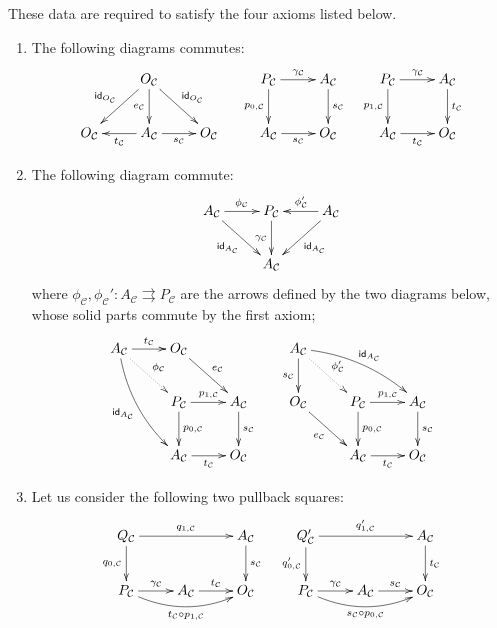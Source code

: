 \documentclass[a4paper,UKenglish,cleveref,pdftex,thm-restate,numberwithinsect]{lipics-v2021}
\newcommand{\id}[1]{\mathsf{id}_{#1}}
\begin{document}
\begin{definition}
These data are required to satisfy the four axioms listed below.
\begin{enumerate}
	\item The following diagrams commutes:
	\[\xymatrix{& O_{\mathcal{C}} \ar[d]_{e_{\mathcal{C}}}\ar[dr]^{\id{O_{\mathcal{C}}}} \ar[dl]_{\id{O_{\mathcal{C}}}} &  &P_{\mathcal{C}} \ar[r]^{\gamma_{\mathcal{C}}} \ar[d]_{p_{0, \mathcal{C}}}& A_{\mathcal{C}} \ar[d]^{s_{\mathcal{C}}} &P_{\mathcal{C}} \ar[r]^{\gamma_{\mathcal{C}}} \ar[d]_{p_{1, \mathcal{C}}}& A_{\mathcal{C}} \ar[d]^{t_{\mathcal{C}}}\\ O_{\mathcal{C}} & A_{\mathcal{C}}  \ar[l]^{t_{\mathcal{C}}}\ar[r]_{s_{\mathcal{C}}}& O_{\mathcal{C}} &  A_{\mathcal{C}} \ar[r]_{s_{\mathcal{C}}}& O_{\mathcal{C}} & A_{\mathcal{C}} \ar[r]_{t_{\mathcal{C}}}& O_{\mathcal{C}} }\]
		\item The following diagram commute:
	\[\xymatrix{A_{\mathcal{C}} \ar[dr]_{\id{A_{\mathcal{C}}}}\ar[r]^{\phi_{\mathcal{C}}}& P_{\mathcal{C}} \ar[d]_{\gamma_{\mathcal{C}}}&A_{\mathcal{C}} \ar[l]_{\phi_{\mathcal{C}}'} \ar[dl]^{\id{A_{\mathcal{C}}}} \\ & A_{\mathcal{C}}}\]
	where $\phi_{\mathcal{C}}, \phi_{\mathcal{C}}'\colon A_{\mathcal{C}}\rightrightarrows P_{\mathcal{C}}$ are the arrows defined by the two diagrams below, whose solid parts commute by the first axiom;
	\[\xymatrix{A_{\mathcal{C}} \ar@/_.3cm/[ddr]_{\id{A_{\mathcal{C}}}} \ar[r]^{t_{\mathcal{C}}}\ar@{.>}[dr]^{\phi_{\mathcal{C}}} & O_{\mathcal{C}} \ar[dr]^{e_{\mathcal{C}}}  &&A_{\mathcal{C}} \ar@/^.3cm/[drr]^{\id{A_{\mathcal{C}}}} \ar[d]_{s_{\mathcal{C}}}\ar@{.>}[dr]^{\phi_{\mathcal{C}}'} \\ & P_{\mathcal{C}} \ar[r]^{p_{1, \mathcal{C}}} \ar[d]^{p_{0, \mathcal{C}}}& A_{\mathcal{C}} \ar[d]^{s_{\mathcal{C}}} &  O_{\mathcal{C}} \ar[dr]_{e_{\mathcal{C}}} & P_{\mathcal{C}} \ar[r]^{p_{1, \mathcal{C}}} \ar[d]^{p_{0, \mathcal{C}}}& A_{\mathcal{C}} \ar[d]^{s_{\mathcal{C}}} \\ & A_{\mathcal{C}} \ar[r]_{t_{\mathcal{C}}}& O_{\mathcal{C}} & &A_{\mathcal{C}} \ar[r]_{t_{\mathcal{C}}}& O_{\mathcal{C}} }\]

\item Let us consider the following two pullback squares:
	\[\xymatrix{Q_{\mathcal{C}} \ar[rr]^{q_{1, \mathcal{C}}} \ar[d]_{q_{0, \mathcal{C}}} & & A_{\mathcal{C}} \ar[d]^{s_{\mathcal{C}}}& Q_{\mathcal{C}}' \ar[rr]^{q'_{1, \mathcal{C}}} \ar[d]_{q'_{0, \mathcal{C}}} &&  A_{\mathcal{C}} \ar[d]^{t_{\mathcal{C}}}\\ P_{\mathcal{C}} \ar@/_.4cm/[rr]_{t_{\mathcal{C}}\circ p_{1, \mathcal{C}}}  \ar[r]^{\gamma_{\mathcal{C}}} & A_{\mathcal{C}} \ar[r]^{t_{\mathcal{C}}} & O_{\mathcal{C}} & P_{\mathcal{C}} \ar@/_.4cm/[rr]_{s_{\mathcal{C}}\circ p_{0, \mathcal{C}}}\ar[r]^{\gamma_{\mathcal{C}}}& A_{\mathcal{C}} \ar[r]^{s_{\mathcal{C}}} & O_{\mathcal{C}}}\]
	

\end{enumerate}
\end{definition}
\end{document}

